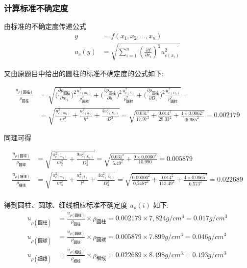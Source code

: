 \documentclass[UTF8]{ctexart}
\begin{document}
\subsubsection{计算标准不确定度}
由标准的不确定度传递公式 
\begin{align*}
    y &= f(x_1,x_2,\dots,x_n) \\
    u_c(y) &= \sqrt{\sum_{i=1}^{n}(\frac{\partial f}{\partial x_i})^2 u^2_{c(x_i)}}
\end{align*}

又由原题目中给出的圆柱的标准不确定度的公式如下:

\begin{align*}
\frac{u_{\rho(\text{圆柱})}}{\rho_{\text{圆柱}}} &=  \sqrt{
\Big( \frac{\partial \rho_{\text{圆柱}} } {\partial m_1} \Big)^2 \frac{u^2_{c(m_1)}}{\rho_{\text{圆柱}}^2}
+\Big( \frac{\partial \rho_{\text{圆柱}} } {\partial h} \Big)^2 \frac{u^2_{ c(h)}}{\rho_{\text{圆柱}}^2}
+ \Big( \frac{\partial \rho_{\text{圆柱}} } {\partial D_1} \Big) ^2 \frac{u^2_{ c(D_1)}}{\rho_{\text{圆柱}}^2}
} = \\
 &= \sqrt{\frac{u^2_{ c(m_1)}}{m_1^2}  +\frac{u_{c(h)}^2}{h^2}  +\frac{4u^2_{ c(D_1)}}{D_1^2}}=\sqrt{\frac{0.031^2}{17.97^2}+\frac{0.014^2}{29.33^2}+\frac{4 \times 0.0062^2}{9.985^2}} = 0.002179
\end{align*}

同理可得

\begin{align*}
    \frac{u_{\rho(\text{圆球})}}{\rho_{\text{圆球}}} &= \sqrt{\frac{u^2_{ c(m_2)}}{m_2^2}  + \frac{9u^2_{ c(D_2)}}{D_2^2}}=\sqrt{\frac{0.031^2}{5.49^2}+\frac{9 \times 0.0060^2}{10.990}} = 0.005879\\
     \frac{u_{\rho(\text{细线})}}{\rho_{\text{细线}}} &= \sqrt{\frac{u^2_{ c(m_3)}}{m_3^2}  +\frac{u_{c(l)}^2}{l^2}  +\frac{4u^2_{ c(D_3)}}{D_3^2}} = \sqrt{\frac{0.00006^2}{0.2487^2}+\frac{0.014^2}{113.49^2}+\frac{4 \times 0.0065^2}{0.573^2}} = 0.022689\\
\end{align*}

得到圆柱、圆球、细线相应标准不确定度 $u_{\rho}(i)$ 如下:
\begin{align*}
    u_{\rho(\text{圆柱})} &= \frac{u_{\rho(\text{圆柱})}}{\rho_{\text{圆柱}}} \times \rho_{\text{圆柱}} =0.002179 \times 7,824 g/cm^3= 0.017 g/cm^3\\
    u_{\rho(\text{圆球})} &= \frac{u_{\rho(\text{圆球})}}{\rho_{\text{圆球}}} \times \rho_{\text{圆球}} =0.005879 \times 7.899 g/cm^3 =  0.046 g/cm^3\\
    u_{\rho(\text{细线})} &= \frac{u_{\rho(\text{细线})}}{\rho_{\text{细线}}} \times \rho_{\text{细线}} = 0.022689 \times 8.498 g/cm^3 = 0.193g/cm^3\\
\end{align*}
\end{document}
